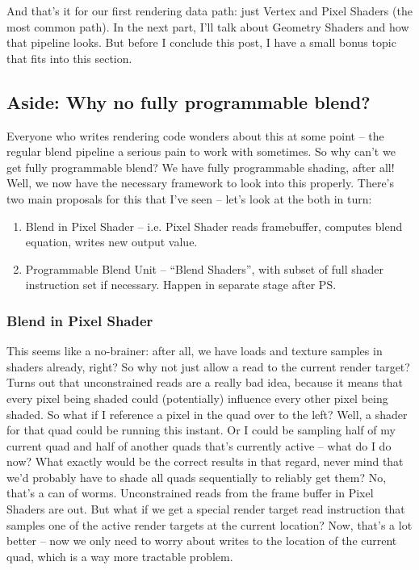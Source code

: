 \documentclass[12pt]{article}
\begin{document}
And that’s it for our first rendering data path: just Vertex and Pixel Shaders (the most common path). In the next part, I’ll talk about Geometry Shaders and how that pipeline looks. But before I conclude this post, I have a small bonus topic that fits into this section.

\subsection{Aside: Why no fully programmable blend?}
\label{sec:org80ca3d2}

Everyone who writes rendering code wonders about this at some point – the regular blend pipeline a serious pain to work with sometimes. So why can’t we get fully programmable blend? We have fully programmable shading, after all! Well, we now have the necessary framework to look into this properly. There’s two main proposals for this that I’ve seen – let’s look at the both in turn:

\begin{enumerate}
\item Blend in Pixel Shader – i.e. Pixel Shader reads framebuffer, computes blend equation, writes new output value.
\item Programmable Blend Unit – “Blend Shaders”, with subset of full shader instruction set if necessary. Happen in separate stage after PS.
\end{enumerate}

\subsubsection{Blend in Pixel Shader}
\label{sec:org17e3f1a}

This seems like a no-brainer: after all, we have loads and texture samples in shaders already, right? So why not just allow a read to the current render target? Turns out that unconstrained reads are a really bad idea, because it means that every pixel being shaded could (potentially) influence every other pixel being shaded. So what if I reference a pixel in the quad over to the left? Well, a shader for that quad could be running this instant. Or I could be sampling half of my current quad and half of another quads that’s currently active – what do I do now? What exactly would be the correct results in that regard, never mind that we’d probably have to shade all quads sequentially to reliably get them? No, that’s a can of worms. Unconstrained reads from the frame buffer in Pixel Shaders are out. But what if we get a special render target read instruction that samples one of the active render targets at the current location? Now, that’s a lot better – now we only need to worry about writes to the location of the current quad, which is a way more tractable problem.
\end{document}
